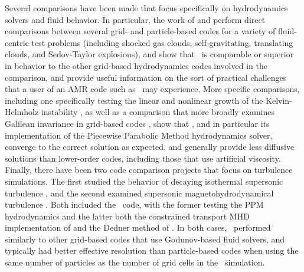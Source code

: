 Several comparisons have been made that focus specifically on
hydrodynamics solvers and fluid behavior.  In particular, the work of
\citet{2007MNRAS.380..963A} and \citet{Tasker2008} perform
direct comparisons between several grid- and particle-based
codes for a variety of fluid-centric test problems (including shocked gas clouds,
self-gravitating, translating clouds, and Sedov-Taylor explosions),
and show that \enzo\ is comparable or superior in behavior to the
other grid-based hydrodynamics codes involved in the comparison, and
provide useful information on the sort of practical challenges that a
user of an
AMR code such as \enzo\ may experience.  More specific comparisons, including one
specifically testing the linear and nonlinear growth of the
Kelvin-Helmholz instability \citep{2012ApJS..201...18M}, as well as a
comparison that more
broadly examines Galilean invariance in grid-based codes
\citep{2010MNRAS.401.2463R}, show that \enzo, and in particular its
implementation of the Piecewise Parabolic Method hydrodynamics solver,
converge to the correct solution as expected, and generally provide
less diffusive solutions than lower-order codes, including those that
use artificial viscosity.  Finally, there have been two code comparison
projects that focus on turbulence simulations.  The first studied the
behavior of decaying isothermal supersonic turbulence
\citep{2009A&A...508..541K}, and the second examined supersonic
magnetohydrodynamical turbulence \citep{2011ApJ...737...13K}.  Both
included the \enzo\ code, with the former testing the PPM
hydrodynamics and the latter both the constrained transport MHD
implementation of \citet{Collins10} and the Dedner method of \citet{WangAbelZhang08}.  In both cases, \enzo\ performed similarly to other
grid-based codes that use Godunov-based fluid solvers, and typically
had better effective resolution than particle-based codes when using the
same number of particles as the number of grid cells in the \enzo\ simulation.

